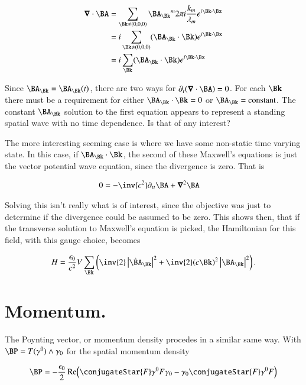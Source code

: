 \begin{align*}
\spacegrad \cdot \BA 
&=
\sum_{\Bk \ne (0,0,0)} {\BA_\Bk}^m 2 \pi i \frac{k_m}{\lambda_m} e^{i \Bk \cdot \Bx} \\
&=
i \sum_{\Bk \ne (0,0,0)} (\BA_\Bk \cdot \Bk) e^{i \Bk \cdot \Bx} \\
&=
i \sum_\Bk (\BA_\Bk \cdot \Bk) e^{i \Bk \cdot \Bx} 
\end{align*}

Since $\BA_\Bk = \BA_\Bk(t)$, there are two ways for $\partial_t (\spacegrad \cdot \BA) = 0$.  For each $\Bk$ there must be a requirement for either $\BA_\Bk \cdot \Bk = 0$ or $\BA_\Bk = \text{constant}$.  The constant $\BA_\Bk$ solution to the first equation appears to represent a standing spatial wave with no time dependence.  Is that of any interest?

The more interesting seeming case is where we have some non-static time varying state.  In this case, if $\BA_\Bk \cdot \Bk$, the second of these Maxwell's equations is just the vector potential wave equation, since the divergence is zero.  That is

\begin{align}\label{eqn:fourierMaxVac:50}
0 &= -\inv{c^2} \partial_{tt} \BA + \spacegrad^2 \BA 
\end{align}

Solving this isn't really what is of interest, since the objective was just to determine if the divergence could be assumed to be zero.  This shows then, that if the transverse solution to Maxwell's equation is picked, the Hamiltonian for this field, with this gauge choice, becomes

\begin{align}
\label{eqn:fourierMaxVac:17c}
H = 
\frac{\epsilon_0}{c^2} V \sum_\Bk
\left(
\inv{2} \Abs{\dot{\BA}_\Bk}^2
+
\inv{2} 
(c \Bk)^2 \Abs{\BA_\Bk}^2 
\right).
\end{align}

\section{Momentum.}

The Poynting vector, or momentum density procedes in a similar same way.  With $\BP = T(\gamma^0) \wedge \gamma_0$ for the spatial momentum density 

\begin{align}\label{eqn:fourierMaxVac:60}
\BP = 
-\frac{\epsilon_0}{2} \Real\Bigl( 
\conjugateStar{F} \gamma^0 F \gamma_0 -\gamma_0 \conjugateStar{F} \gamma^0 F 
\Bigr) 
\end{align}


